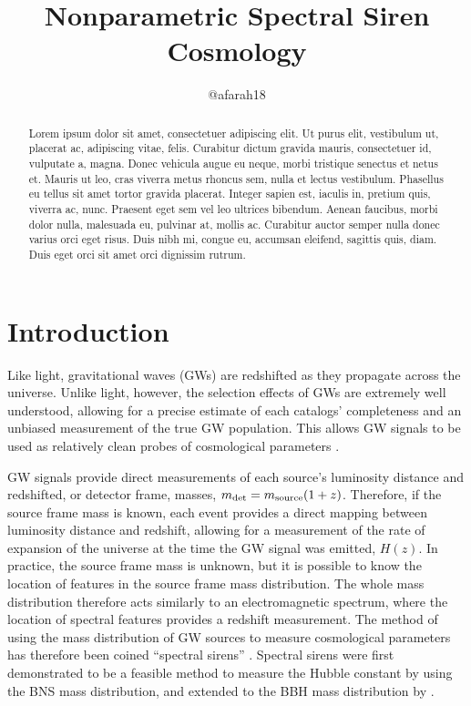 \documentclass[]{aastex631}
\begin{document}
\title{Nonparametric Spectral Siren Cosmology}

\author{@afarah18}

\begin{abstract}
    Lorem ipsum dolor sit amet, consectetuer adipiscing elit.
    Ut purus elit, vestibulum ut, placerat ac, adipiscing vitae, felis.
    Curabitur dictum gravida mauris, consectetuer id, vulputate a, magna.
    Donec vehicula augue eu neque, morbi tristique senectus et netus et.
    Mauris ut leo, cras viverra metus rhoncus sem, nulla et lectus vestibulum.
    Phasellus eu tellus sit amet tortor gravida placerat.
    Integer sapien est, iaculis in, pretium quis, viverra ac, nunc.
    Praesent eget sem vel leo ultrices bibendum.
    Aenean faucibus, morbi dolor nulla, malesuada eu, pulvinar at, mollis ac.
    Curabitur auctor semper nulla donec varius orci eget risus.
    Duis nibh mi, congue eu, accumsan eleifend, sagittis quis, diam.
    Duis eget orci sit amet orci dignissim rutrum.
\end{abstract}

\section{Introduction}
\label{sec:intro}
Like light, gravitational waves (GWs) are redshifted as they propagate across the universe.
Unlike light, however, the selection effects of GWs are extremely well understood, allowing for a precise estimate of each catalogs' completeness and an unbiased measurement of the true GW population.
This allows GW signals to be used as relatively clean probes of cosmological parameters \citep[e.g.][]{bright sirens first paper, 170817 bright siren, dark siren first paper, dark siren with 0817, hithhikers guide}.

GW signals provide direct measurements of each source's luminosity distance and redshifted, or detector frame, masses, $m_{\det}= m_{\text{source}}(1+z)$.
Therefore, if the source frame mass is known, each event provides a direct mapping between luminosity distance and redshift, allowing for a measurement of the rate of expansion of the universe at the time the GW signal was emitted, $H(z)$.
In practice, the source frame mass is unknown, but it is possible to know the location of features in the source frame mass distribution.
The whole mass distribution therefore acts similarly to an electromagnetic spectrum, where the location of spectral features provides a redshift measurement.
The method of using the mass distribution of GW sources to measure cosmological parameters has therefore been coined ``spectral sirens'' \citep{ezquiaga_spectral_2022}.
Spectral sirens were first demonstrated to be a feasible method to measure the Hubble constant by \cite{chernoff+fin} using the BNS mass distribution, and extended to the BBH mass distribution by \cite{farr_future_2019}.
\end{document}
